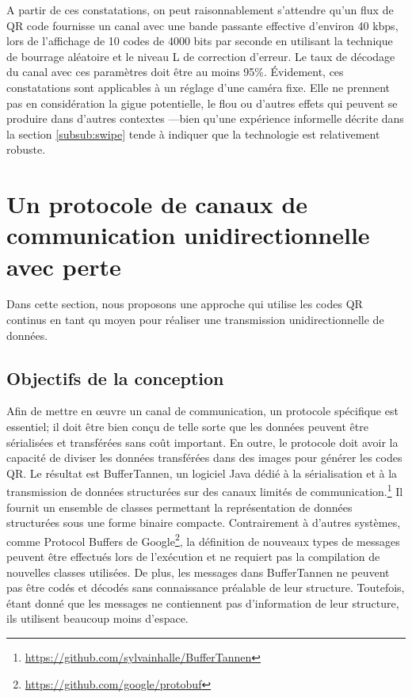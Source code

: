 A partir de ces constatations, on peut raisonnablement s'attendre qu'un flux de QR code fournisse un canal avec une bande passante effective d'environ 40 kbps, lors de l'affichage de 10 codes de 4000 bits par seconde en utilisant la technique de bourrage aléatoire et le niveau L de correction d'erreur. Le taux de décodage du canal avec ces paramètres doit être au moins 95\%. Évidement, ces constatations sont applicables à un réglage d'une caméra fixe. Elle ne prennent pas en considération la gigue potentielle, le flou ou d'autres effets qui peuvent se produire dans d'autres contextes ---bien qu'une expérience informelle décrite dans la section \ref{subsub:swipe} tende à indiquer que la technologie est relativement robuste.


\section{Un protocole de canaux de communication unidirectionnelle avec perte}\label{sec:qr:protocol} %

Dans cette section, nous proposons une approche qui utilise les codes QR continus en tant qu moyen pour réaliser une transmission unidirectionnelle de données.

\subsection{Objectifs de la conception}

Afin de mettre en \oe{}uvre un canal de communication, un protocole spécifique est essentiel; il doit être bien conçu de telle sorte que les données peuvent être sérialisées et transférées sans coût important. En outre, le protocole doit avoir la capacité de diviser les données transférées dans des images pour générer les codes QR. Le résultat est BufferTannen, un logiciel Java dédié à la sérialisation et à la transmission de données structurées sur des canaux limités de communication.\footnote{\url{https://github.com/sylvainhalle/BufferTannen}} Il fournit un ensemble de classes permettant la représentation de données structurées sous une forme binaire compacte. Contrairement à d'autres systèmes, comme Protocol Buffers de Google\footnote{\url{https://github.com/google/protobuf}}, la définition de nouveaux types de messages peuvent être effectués lors de l'exécution et ne requiert pas la compilation de nouvelles classes utilisées. De plus, les messages dans BufferTannen ne peuvent pas être codés et décodés sans connaissance préalable de leur structure. Toutefois, étant donné que les messages ne contiennent pas d'information de leur structure, ils utilisent beaucoup moins d'espace.

